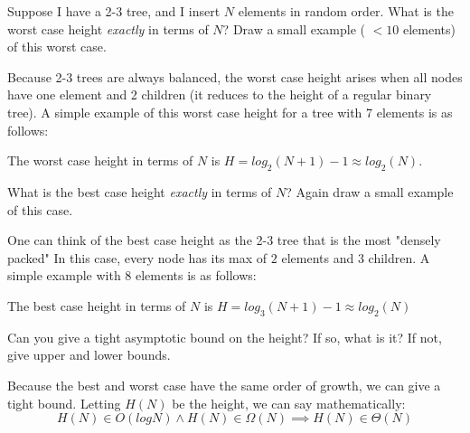 \begin{blocksection}
\begin{parts}
\item Suppose I have a 2-3 tree, and I insert $N$ elements in random order. What is the worst case height \textit{exactly} in terms of $N$? Draw a small example ( $< 10$ elements) of this worst case. 

\begin{solution}[2in]
Because 2-3 trees are always balanced, the worst case height arises when all nodes have one element and 2 children (it reduces to the height of a regular binary tree). A simple example of this worst case height for a tree with 7 elements is as follows: %

The worst case height in terms of $N$ is $H = log_{2}(N + 1) - 1 \approx log_{2}(N)$. 
\end{solution}

\item What is the best case height \textit{exactly} in terms of $N$? Again draw a small example of this case. 

\begin{solution}[2in]
One can think of the best case height as the 2-3 tree that is the most "densely packed" In this case, every node has its max of $2$ elements and $3$ children. A simple example with 8 elements is as follows: %

The best case height in terms of $N$ is $H = log_{3}(N + 1) - 1 \approx log_2(N)$
\end{solution}

\item Can you give a tight asymptotic bound on the height? If so, what is it? If not, give upper and lower bounds.

\begin{solution}[2in]
Because the best and worst case have the same order of growth, we can give a tight bound. Letting $H(N)$ be the height, we can say mathematically: $$H(N) \in O(logN) \land H(N) \in \Omega(N) \implies H(N) \in \Theta(N)$$
\end{solution}
\end{parts}

\end{blocksection}